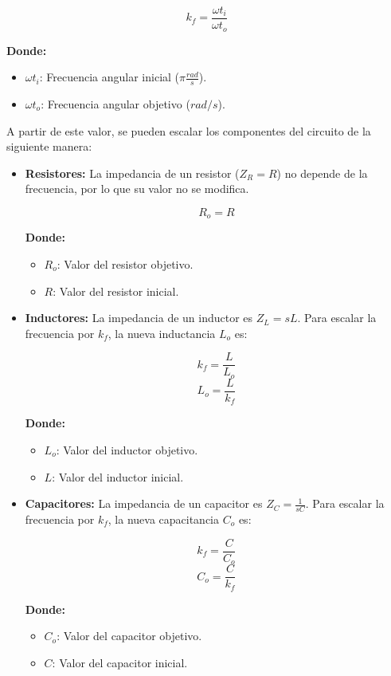 \documentclass[12pt, letterpaper]{article}
\begin{document}
\[k_f = \frac{{\omega t}_i}{{\omega t}_o}\]

\textbf{Donde:}

\begin{itemize}
    \item \({\omega t}_i\): Frecuencia angular inicial (\(\pi \frac{rad}{s}\)).
    \item \({\omega t}_o\): Frecuencia angular objetivo (\(rad/s\)).
\end{itemize}

A partir de este valor, se pueden escalar los componentes del circuito de la siguiente manera:

\begin{itemize}
    \item \textbf{Resistores:} La impedancia de un resistor (\(Z_R = R\)) no depende de la frecuencia, por lo que su valor no se modifica.

    \[ R_o = R \]

    \textbf{Donde:}
    \begin{itemize}
        \item \(R_o\): Valor del resistor objetivo.
        \item \(R\): Valor del resistor inicial.
    \end{itemize}

    \item \textbf{Inductores:} La impedancia de un inductor es \(Z_L = sL\). Para escalar la frecuencia por \(k_f\), la nueva inductancia \(L_o\) es:

    \[k_f = \frac{L}{L_o} \]
    \[L_o = \frac{L}{k_f} \]

    \textbf{Donde:}
    \begin{itemize}
        \item \(L_o\): Valor del inductor objetivo.
        \item \(L\): Valor del inductor inicial.
    \end{itemize}

    \item \textbf{Capacitores:} La impedancia de un capacitor es \(Z_C = \frac{1}{s C}\). Para escalar la frecuencia por \(k_f\), la nueva capacitancia \(C_o\) es:

    \[k_f = \frac{C}{C_o} \]
    \[C_o = \frac{C}{k_f} \]

    \textbf{Donde:}
    \begin{itemize}
        \item \(C_o\): Valor del capacitor objetivo.
        \item \(C\): Valor del capacitor inicial.
    \end{itemize}
\end{itemize}
\end{document}
